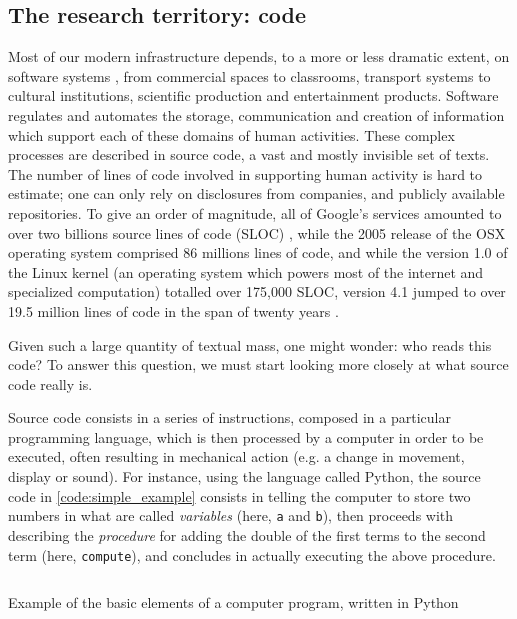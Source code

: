 \subsection{The research territory: code}
\label{subsec:research-territory}

Most of our modern infrastructure depends, to a more or less dramatic extent, on software systems \citep{kitchin_code_2011}, from commercial spaces to classrooms, transport systems to cultural institutions, scientific production and entertainment products. Software regulates and automates the storage, communication and creation of information which support each of these domains of human activities. These complex processes are described in source code, a vast and mostly invisible set of texts. The number of lines of code involved in supporting human activity is hard to estimate; one can only rely on disclosures from companies, and publicly available repositories. To give an order of magnitude, all of Google's services amounted to over two billions source lines of code (SLOC) \citep{scale_why_2015}, while the 2005 release of the OSX operating system comprised 86 millions lines of code, and while the version 1.0 of the Linux kernel (an operating system which powers most of the internet and specialized computation) totalled over 175,000 SLOC, version 4.1 jumped to over 19.5 million lines of code in the span of twenty years \citep{wikipedia_linux_2021}.

Given such a large quantity of textual mass, one might wonder: who reads this code? To answer this question, we must start looking more closely at what source code really is.

Source code consists in a series of instructions, composed in a particular programming language, which is then processed by a computer in order to be executed, often resulting in mechanical action (e.g. a change in movement, display or sound). For instance, using the language called Python, the source code in \ref{code:simple_example} consists in telling the computer to store two numbers in what are called \emph{variables} (here, \lstinline{a} and \lstinline{b}), then proceeds with describing the \emph{procedure} for adding the double of the first terms to the second term (here, \lstinline{compute}), and concludes in actually executing the above procedure.

\begin{listing}
    \inputminted{python}{./corpus/simple.py}
    \caption{Example of the basic elements of a computer program, written in Python}
    \label{code:simple_example}
\end{listing}

